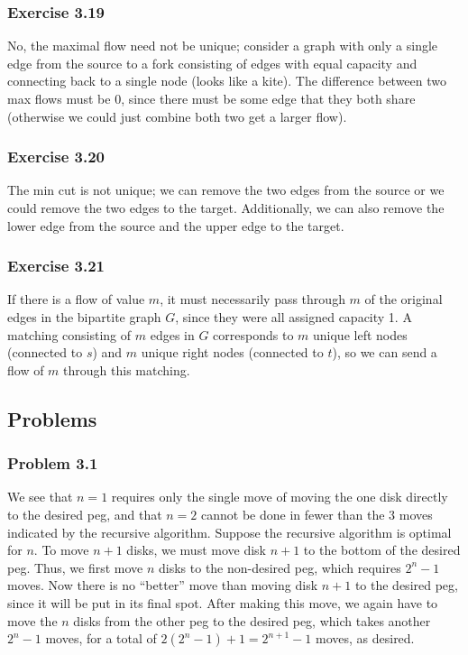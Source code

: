 \subsubsection{Exercise 3.19}
No, the maximal flow need not be unique; consider a graph with only a single edge from the source to a fork
consisting of edges with equal capacity and connecting back to a single node (looks like a kite). The 
difference between two max flows must be 0, since there must be some edge that they both share (otherwise we
could just combine both two get a larger flow).

\subsubsection{Exercise 3.20}
The min cut is not unique; we can remove the two edges from the source or we could remove the two edges to
the target. Additionally, we can also remove the lower edge from the source and the upper edge to the target.

\subsubsection{Exercise 3.21}
If there is a flow of value $m$, it must necessarily pass through $m$ of the original edges in the bipartite
graph $G$, since they were all assigned capacity 1. A matching consisting of $m$ edges in $G$ corresponds to
$m$ unique left nodes (connected to $s$) and  $m$ unique right nodes (connected to $t $), so we can send a 
flow of $m$ through this matching.

\subsection{Problems}

\subsubsection{Problem 3.1}
We see that $n = 1$ requires only the single move of moving the one disk directly to the desired peg, and that
$n = 2$ cannot be done in fewer than the 3 moves indicated by the recursive algorithm. Suppose the recursive
algorithm is optimal for $n$. To move $n + 1$ disks, we must move disk $n + 1$ to the bottom of the desired peg.
Thus, we first move $n$ disks to the non-desired peg, which
requires $2^n - 1$ moves. Now there is no ``better'' move than moving disk $n + 1$ to the desired peg, since
it will be put in its final spot. After making this move, we again have to move the $n$ disks from the other 
peg to the desired peg, which takes another $2^n - 1$ moves, for a total of $2(2^n - 1) + 1 = 2^{n+1} - 1$ 
moves, as desired.

